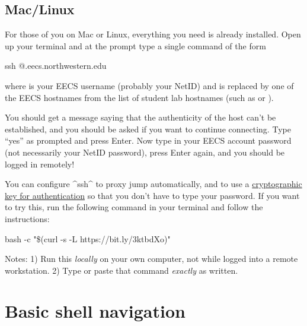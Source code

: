 \documentclass{tufte-handout}
\def\setupScriptUrl{https://bit.ly/3ktbdXo}
\begin{document}
\subsection{Mac/Linux}

For those of you on Mac or Linux, everything you need is already
installed. Open up your terminal and at the prompt
type a single command of the form

\begin{CmdLine*}
  \C ssh @.eecs.northwestern.edu\\
\end{CmdLine*}

\noindent where  is your EECS username (probably your NetID)
and  is replaced by one of the EECS hostnames from the list
of student lab hostnames%
\marginnote{\LabHostnamesLink}
(such as  or
).

You should get a message saying that the authenticity of the host
can't be established, and you should be asked if you want to continue
connecting.  Type ``yes'' as prompted and press Enter. Now type in your
EECS account password (not necessarily your NetID password), press
Enter again, and you should be logged in remotely!

You can configure ^ssh^ to proxy jump automatically, and to use a
\href{https://en.wikipedia.org/wiki/Key_authentication}{cryptographic
key for authentication} so that you don’t have to type your password. If
you want to try this, run the following command in your terminal and
follow the instructions:

\begin{CmdLine*}
  \C bash -c "\$(curl -s -L \setupScriptUrl)"\\
\end{CmdLine*}


Notes: 1) Run this \emph{locally} on your own computer, not while logged
into a remote workstation. 2) Type or paste that command \emph{exactly}
as written.

\section{Basic shell navigation}
\end{document}
